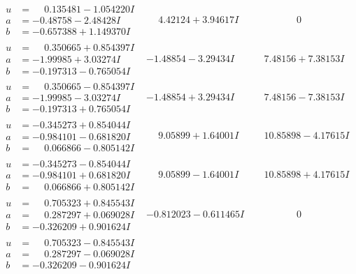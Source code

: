 \documentclass[1p]{elsarticle_modified}
\theoremstyle{definition}
\begin{document}
$$\begin{array}{c|c|c}
\begin{aligned}
u &= \phantom{-}0.135481 - 1.054220 I \\
a &= -0.48758 - 2.48428 I \\
b &= -0.657388 + 1.149370 I\end{aligned}
 & \phantom{-}4.42124 + 3.94617 I & \phantom{-0.000000 } 0 \\ \hline\begin{aligned}
u &= \phantom{-}0.350665 + 0.854397 I \\
a &= -1.99985 + 3.03274 I \\
b &= -0.197313 - 0.765054 I\end{aligned}
 & -1.48854 - 3.29434 I & \phantom{-}7.48156 + 7.38153 I \\ \hline\begin{aligned}
u &= \phantom{-}0.350665 - 0.854397 I \\
a &= -1.99985 - 3.03274 I \\
b &= -0.197313 + 0.765054 I\end{aligned}
 & -1.48854 + 3.29434 I & \phantom{-}7.48156 - 7.38153 I \\ \hline\begin{aligned}
u &= -0.345273 + 0.854044 I \\
a &= -0.984101 - 0.681820 I \\
b &= \phantom{-}0.066866 - 0.805142 I\end{aligned}
 & \phantom{-}9.05899 + 1.64001 I & \phantom{-}10.85898 - 4.17615 I \\ \hline\begin{aligned}
u &= -0.345273 - 0.854044 I \\
a &= -0.984101 + 0.681820 I \\
b &= \phantom{-}0.066866 + 0.805142 I\end{aligned}
 & \phantom{-}9.05899 - 1.64001 I & \phantom{-}10.85898 + 4.17615 I \\ \hline\begin{aligned}
u &= \phantom{-}0.705323 + 0.845543 I \\
a &= \phantom{-}0.287297 + 0.069028 I \\
b &= -0.326209 + 0.901624 I\end{aligned}
 & -0.812023 - 0.611465 I & \phantom{-0.000000 } 0 \\ \hline\begin{aligned}
u &= \phantom{-}0.705323 - 0.845543 I \\
a &= \phantom{-}0.287297 - 0.069028 I \\
b &= -0.326209 - 0.901624 I\end{aligned}

\end{array}$$
\end{document}
